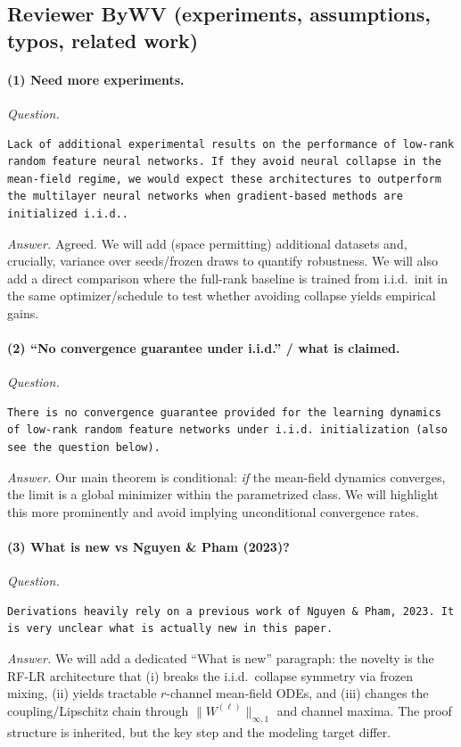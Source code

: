 \documentclass[11pt,a4paper]{article}
\newcommand{\NP}{Nguyen \& Pham (2023)}
\begin{document}
\subsection*{Reviewer ByWV (experiments, assumptions, typos, related work)}

\paragraph{(1) Need more experiments.}
\textit{Question.}\par
\begin{verbatim}
Lack of additional experimental results on the performance of low-rank random feature neural networks. If they avoid neural collapse in the mean-field regime, we would expect these architectures to outperform the multilayer neural networks when gradient-based methods are initialized i.i.d..
\end{verbatim}
\textit{Answer.} Agreed. We will add (space permitting) additional datasets and, crucially, variance over seeds/frozen draws to quantify robustness. We will also add a direct comparison where the full-rank baseline is trained from i.i.d.\ init in the same optimizer/schedule to test whether avoiding collapse yields empirical gains.

\paragraph{(2) ``No convergence guarantee under i.i.d.'' / what is claimed.}
\textit{Question.}\par
\begin{verbatim}
There is no convergence guarantee provided for the learning dynamics of low-rank random feature networks under i.i.d. initialization (also see the question below). 
\end{verbatim}
\textit{Answer.} Our main theorem is conditional: \emph{if} the mean-field dynamics converges, the limit is a global minimizer within the parametrized class. We will highlight this more prominently and avoid implying unconditional convergence rates.

\paragraph{(3) What is new vs \NP{}?}
\textit{Question.}\par
\begin{verbatim}
Derivations heavily rely on a previous work of Nguyen & Pham, 2023. It is very unclear what is actually new in this paper.
\end{verbatim}
\textit{Answer.} We will add a dedicated ``What is new'' paragraph: the novelty is the RF-LR architecture that (i) breaks the i.i.d.\ collapse symmetry via frozen mixing, (ii) yields tractable $r$-channel mean-field ODEs, and (iii) changes the coupling/Lipschitz chain through $\|W^{(\ell)}\|_{\infty,1}$ and channel maxima. The proof structure is inherited, but the key step and the modeling target differ.
\end{document}
